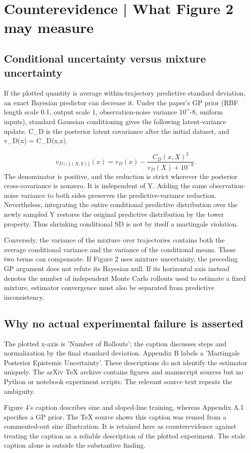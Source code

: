 \documentclass[10pt]{article}
\begin{document}
\section*{Counterevidence | What Figure 2 may measure}
\subsection*{Conditional uncertainty versus mixture uncertainty}
If the plotted quantity is average within-trajectory predictive standard deviation, an exact Bayesian predictor can decrease it. Under the paper’s GP prior (RBF length scale 0.1, output scale 1, observation-noise variance 10\textasciicircum{}-8, uniform inputs), standard Gaussian conditioning gives the following latent-variance update. C\_D is the posterior latent covariance after the initial dataset, and v\_D(x) = C\_D(x,x).\par
\[v_{D\cup\{(X,Y)\}}(x)=v_D(x)-\frac{C_D(x,X)^2}{v_D(X)+10^{-8}}.\] The denominator is positive, and the reduction is strict wherever the posterior cross-covariance is nonzero. It is independent of Y. Adding the same observation-noise variance to both sides preserves the predictive-variance reduction. Nevertheless, integrating the entire conditional predictive distribution over the newly sampled Y restores the original predictive distribution by the tower property. Thus shrinking conditional SD is not by itself a martingale violation.\par
Conversely, the variance of the mixture over trajectories contains both the average conditional variance and the variance of the conditional means. These two terms can compensate. If Figure 2 uses mixture uncertainty, the preceding GP argument does not refute its Bayesian null. If its horizontal axis instead denotes the number of independent Monte Carlo rollouts used to estimate a fixed mixture, estimator convergence must also be separated from predictive inconsistency.\par
\subsection*{Why no actual experimental failure is asserted}
The plotted x-axis is ’Number of Rollouts’; the caption discusses steps and normalization by the final standard deviation. Appendix B labels a ’Martingale Posterior Epistemic Uncertainty’. These descriptions do not identify the estimator uniquely. The arXiv TeX archive contains figures and manuscript sources but no Python or notebook experiment scripts. The relevant source text repeats the ambiguity.\par
Figure 4’s caption describes sine and sloped-line training, whereas Appendix A.1 specifies a GP prior. The TeX source shows this caption was reused from a commented-out sine illustration. It is retained here as counterevidence against treating the caption as a reliable description of the plotted experiment. The stale caption alone is outside the substantive finding.\par
\end{document}
